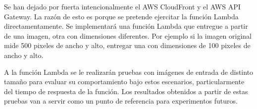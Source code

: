 Se han dejado por fuerta intencionalmente el AWS CloudFront y el AWS API Gateway. La razón de esto es porque se pretende ejercitar la función Lambda directamentamente. Se implementará una función Lambda que entregue a partir de una imagen, otra con dimensiones diferentes. Por ejemplo si la imagen original mide 500 pixeles de ancho y alto, entregar una con dimensiones de 100 pixeles de ancho y alto. 

A la función Lambda se le realizarán pruebas con imágenes de entrada de distinto tamaño para evaluar su comportamiento bajo estos escenarios, particularmente del tiempo de respuesta de la función. Los resultados obtenidos a partir de estas pruebas van a servir como un punto de referencia para experimentos futuros. 